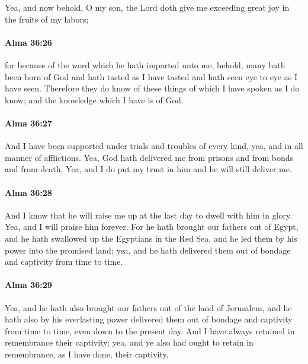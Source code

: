 			Yea, and now behold, O my son,
			the Lord doth give me exceeding great joy in the fruits of my labors;

		\paragraph{Alma 36:26} %
			\label{ALMA-36-26}

			for because of the word which he hath imparted unto me,
			behold, many hath been born of God
			and hath tasted as I have tasted
			and hath seen eye to eye as I have seen.
			Therefore they do know of these things of which I have spoken as I do know;
			and the knowledge which I have is of God.

		\paragraph{Alma 36:27} %
			\label{ALMA-36-27}

			And I have been supported under trials and troubles of every kind,
			yea, and in all manner of afflictions.
			Yea, God hath delivered me from prisons and from bonds and from death.
			Yea, and I do put my trust in him and he will still deliver me.

		\paragraph{Alma 36:28} %
			\label{ALMA-36-28}

			And I know that he will raise me up at the last day to dwell with him in glory.
			Yea, and I will praise him forever.
			For he hath brought our fathers out of Egypt,
			and he hath swallowed up the Egyptians in the Red Sea,
			and he led them by his power into the promised land;
			yea, and he hath delivered them out of bondage and captivity from time to time.

		\paragraph{Alma 36:29} %
			\label{ALMA-36-29}

			Yea, and he hath also brought our fathers out of the land of Jerusalem,
			and he hath also by his everlasting power delivered them
			out of bondage and captivity from time to time, even down to the present day.
			And I have always retained in remembrance their captivity;
			yea, and ye also had ought to retain in remembrance, as I have done, their captivity.

